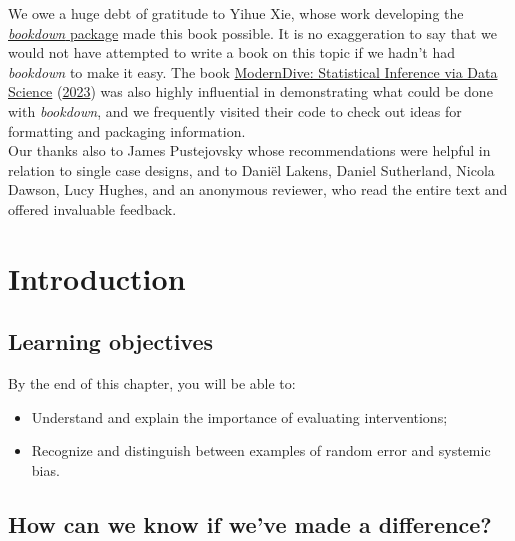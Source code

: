 \documentclass{krantz}
\begin{document}
We owe a huge debt of gratitude to Yihue Xie, whose work developing the \href{https://bookdown.org/}{\emph{bookdown} package} made this book possible. It is no exaggeration to say that we would not have attempted to write a book on this topic if we hadn't had \emph{bookdown} to make it easy. The book \href{https://moderndive.com/}{ModernDive: Statistical Inference via Data Science}  (\protect\hyperlink{ref-ismay2023}{2023}) was also highly influential in demonstrating what could be done with \emph{bookdown}, and we frequently visited their code to check out ideas for formatting and packaging information.\\
Our thanks also to James Pustejovsky whose recommendations were helpful in relation to single case designs, and to Daniël Lakens, Daniel Sutherland, Nicola Dawson, Lucy Hughes, and an anonymous reviewer, who read the entire text and offered invaluable feedback.




\listoffigures
\listoftables

\mainmatter

\hypertarget{intro}{%
\chapter{Introduction}\label{intro}}

\hypertarget{learning-objectives}{%
\section{Learning objectives}\label{learning-objectives}}

By the end of this chapter, you will be able to:

\begin{itemize}
\item
  Understand and explain the importance of evaluating interventions;
\item
  Recognize and distinguish between examples of random error and systemic bias.
\end{itemize}

\hypertarget{how-can-we-know-if-weve-made-a-difference}{%
\section{How can we know if we've made a difference?}\label{how-can-we-know-if-weve-made-a-difference}}
\end{document}
